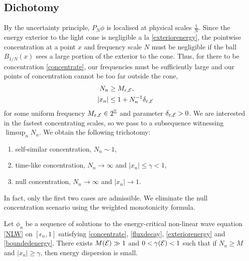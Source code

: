 	
\subsection{Dichotomy}



By the uncertainty principle, $P_N \phi$ is localised at physical scales $\tfrac1N$. Since the energy exterior to the light cone is negligible a la \eqref{exteriorenergy}, the pointwise concentration at a point $x$ and frequency scale $N$ must be negligible if the ball $B_{1/N} (x)$ sees a large portion of the exterior to the cone. Thus, for there to be concentration \eqref{concentrate}, our frequencies must be sufficiently large and our points of concentration cannot be too far outside the cone, 
	\begin{align*}
		N_n 
			&\geq M_{\varepsilon, \mathcal E}, \\
		|x_n|
			&\leq 1 + N^{-1}_n \delta_{\varepsilon, \mathcal E}
	\end{align*}
for some uniform frequency $M_{\varepsilon, \mathcal E} \in 2^\mathbb Z$ and parameter $\delta_{\varepsilon, \mathcal E} > 0$. We are interested in the fastest concentrating scales, so we pass to a subsequence witnessing $\limsup_n N_n$. We obtain the following trichotomy:
	\begin{enumerate}
		\item self-similar concentration, $N_n \sim 1$, 
		 
		\item time-like concentration, $N_n \to \infty$ and $|x_n| \leq \gamma < 1$, 
		
		\item null concentration, $N_n \to \infty$ and $|x_n| \to 1$.
	\end{enumerate}
In fact, only the first two cases are admissible. We eliminate the null concentration scenario using the weighted monotonicity formula. 


\begin{lemma}
	Let $\phi_n$ be a sequence of solutions to the energy-critical non-linear wave equation \eqref{NLW} on $[\epsilon_n, 1]$ satisfying \eqref{concentrate}, \eqref{fluxdecay}, \eqref{exteriorenergy} and \eqref{boundedenergy}. There exists $M(\mathcal E) \gg 1$ and $0 < \gamma (\mathcal E) < 1$ such that if $N_n \geq M$ and $|x_n| \geq \gamma$, then energy dispersion is small. 
\end{lemma}